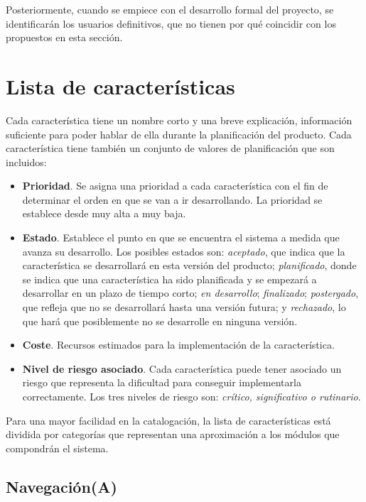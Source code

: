 	Posteriormente, cuando se empiece con el desarrollo formal del proyecto, se identificarán los usuarios definitivos, que no tienen por qué coincidir con los propuestos en esta sección.
	

% 
%
\section{Lista de características} %
	\label{sec:lista_de_caracteristicas}
	
	Cada característica tiene un nombre corto y una breve explicación, información suficiente para poder hablar de ella durante la planificación del producto. Cada característica tiene también un conjunto de valores de planificación que son incluidos:
	
	\begin{itemize}
		\item{{\bf Prioridad}. Se asigna una prioridad a cada característica con el fin de determinar el orden en que se van a ir desarrollando. La prioridad se establece desde muy alta a muy baja.}
		\item{{\bf Estado}. Establece el punto en que se encuentra el sistema a medida que avanza su desarrollo. Los posibles estados son: {\it aceptado}, que indica que la característica se desarrollará en esta versión del producto; {\it planificado}, donde se indica que una característica ha sido planificada y se empezará a desarrollar en un plazo de tiempo corto; {\it en desarrollo}; {\it finalizado}; {\it postergado}, que refleja que no se desarrollará hasta una versión futura; y {\it rechazado}, lo que hará que posiblemente no se desarrolle en ninguna versión.}
		\item{{\bf Coste}. Recursos estimados para la implementación de la característica.}
		\item{{\bf Nivel de riesgo asociado}. Cada característica puede tener asociado un riesgo que representa la dificultad para conseguir implementarla correctamente. Los tres niveles de riesgo son: {\it crítico, significativo o rutinario}.}
	\end{itemize}
	
	Para una mayor facilidad en la catalogación, la lista de características está dividida por categorías que representan una aproximación a los módulos que compondrán el sistema.
%
%
\subsection{Navegación(A)} %
	\label{sub:lc_navegacion}
	

